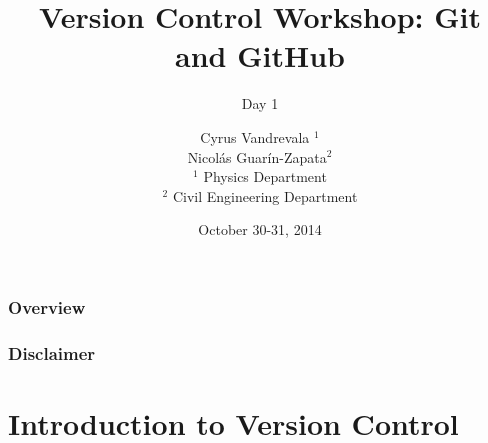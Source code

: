 



\title{Version Control Workshop: Git and GitHub}
\subtitle{Day 1}
\author[AUTHOR]{\scriptsize{Cyrus Vandrevala $^1$\\Nicol\'as Guar\'in-Zapata$^2$}\\
\tiny{$^1$ Physics Department\\ $^2$ Civil Engineering Department}}
\date{October 30-31, 2014}




\begin{frame}[plain]
  \titlepage
\end{frame}


\begin{frame}
\frametitle{\large{Overview}}
\tableofcontents
\end{frame}

\begin{frame}
\frametitle{\large{Disclaimer}}

\end{frame}


\section[Intro]{Introduction to Version Control}

